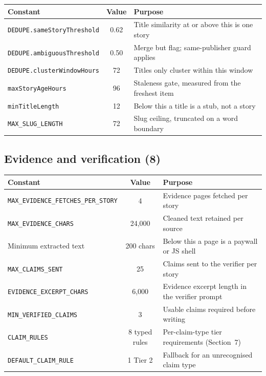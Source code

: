 \documentclass[11pt,a4paper]{article}
\newcommand{\brk}{\hyphenpenalty=0\exhyphenpenalty=0\relax}
\newcommand{\code}[1]{\texttt{\small\brk #1}}
\begin{document}
\begin{center}
\footnotesize
\begin{tabularx}{\textwidth}{@{}>{\RaggedRight}p{5.0cm} c >{\RaggedRight}X@{}}
\toprule
\textbf{Constant} & \textbf{Value} & \textbf{Purpose} \\
\midrule
\code{DEDUPE.sameStoryThreshold} & 0.62 & Title similarity at or above this is one story \\
\code{DEDUPE.ambiguousThreshold} & 0.50 & Merge but flag; same-publisher guard applies \\
\code{DEDUPE.clusterWindowHours} & 72 & Titles only cluster within this window \\
\code{maxStoryAgeHours} & 96 & Staleness gate, measured from the freshest item \\
\code{minTitleLength} & 12 & Below this a title is a stub, not a story \\
\code{MAX\_SLUG\_LENGTH} & 72 & Slug ceiling, truncated on a word boundary \\
\bottomrule
\end{tabularx}
\end{center}

\subsection{Evidence and verification (8)}

\begin{center}
\footnotesize
\begin{tabularx}{\textwidth}{@{}>{\RaggedRight}p{5.0cm} c >{\RaggedRight}X@{}}
\toprule
\textbf{Constant} & \textbf{Value} & \textbf{Purpose} \\
\midrule
\code{MAX\_EVIDENCE\_}\allowbreak\code{FETCHES\_PER\_STORY} & 4 & Evidence pages fetched per story \\
\code{MAX\_EVIDENCE\_CHARS} & 24{,}000 & Cleaned text retained per source \\
Minimum extracted text & 200 chars & Below this a page is a paywall or JS shell \\
\code{MAX\_CLAIMS\_SENT} & 25 & Claims sent to the verifier per story \\
\code{EVIDENCE\_EXCERPT\_CHARS} & 6{,}000 & Evidence excerpt length in the verifier prompt \\
\code{MIN\_VERIFIED\_CLAIMS} & 3 & Usable claims required before writing \\
\code{CLAIM\_RULES} & 8 typed rules & Per-claim-type tier requirements (Section~7) \\
\code{DEFAULT\_CLAIM\_RULE} & 1 Tier 2 & Fallback for an unrecognised claim type \\
\bottomrule
\end{tabularx}
\end{center}
\end{document}
